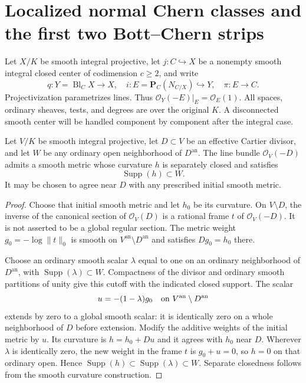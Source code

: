 \section{Localized normal Chern classes and the first two Bott--Chern strips}
\label{r15m:section}

Let $X/K$ be smooth integral projective, let
$j:C\hookrightarrow X$ be a nonempty smooth integral closed
center of codimension $c\geq2$, and write
\[
 q:Y=\operatorname{Bl}_C X\longrightarrow X,
 \quad i:E=\mathbf P_C(N_{C/X})\hookrightarrow Y,
 \quad \pi:E\longrightarrow C.
\tag{SD15.1}\label{r15m:setup}
\]
Projectivization parametrizes lines.  Thus
$\mathcal O_Y(-E)|_E=\mathcal O_E(1)$.
All spaces, ordinary sheaves, tests, and degrees are over
the original $K$.  A disconnected smooth center will be
handled component by component after the integral case.

\begin{lemma}
\label{r15m:localized-metric}
Let $V/K$ be smooth integral projective, let $D\subset V$
be an effective Cartier divisor, and let $W$ be any ordinary
open neighborhood of $D^{\mathrm{an}}$.  The line bundle
$\mathcal O_V(-D)$ admits a smooth metric whose curvature
$h$ is separately closed and satisfies
\[
                         \operatorname{Supp}(h)\subset W.
\tag{SD15.2}\label{r15m:localized-support}
\]
It may be chosen to agree near $D$ with any prescribed
initial smooth metric.
\end{lemma}

\begin{proof}
Choose that initial smooth metric and let $h_0$ be its
curvature.  On $V\setminus D$, the inverse of the canonical
section of $\mathcal O_V(D)$ is a rational frame $t$ of
$\mathcal O_V(-D)$.  It is not asserted to be a global
regular section.  The metric weight
$g_0=-\log\|t\|_0$ is smooth on $V^{\mathrm{an}}\setminus
D^{\mathrm{an}}$ and satisfies $Dg_0=h_0$ there.

Choose an ordinary smooth scalar $\lambda$ equal to one on
an ordinary neighborhood of $D^{\mathrm{an}}$, with
$\operatorname{Supp}(\lambda)\subset W$.
Compactness of the divisor and ordinary smooth partitions
of unity give this cutoff with the indicated closed support.
The scalar
\[
             u=-(1-\lambda)g_0
                  \quad\hbox{on }V^{\mathrm{an}}\setminus D^{\mathrm{an}}
\]
extends by zero to a global smooth scalar: it is identically
zero on a whole neighborhood of $D$ before extension.
Modify the additive weights of the initial metric by $u$.
Its curvature is $h=h_0+Du$ and it agrees with $h_0$ near
$D$.  Wherever $\lambda$ is identically zero, the new
weight in the frame $t$ is $g_0+u=0$, so $h=0$ on that
ordinary open.  Hence
$\operatorname{Supp}(h)\subset\operatorname{Supp}(\lambda)
\subset W$.  Separate closedness follows from the smooth
curvature construction.
\end{proof}

